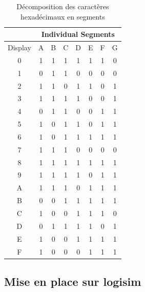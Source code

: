 \documentclass{article}
\begin{document}
    \begin{table}[H]
        \centering
        \begin{tabular}{|c|c|c|c|c|c|c|c|}
            \hline
            & \multicolumn{7}{c|}{Individual Segments} \\
            \hline
            Display & A & B & C & D & E & F & G \\
            \hline
            0       & 1 & 1 & 1 & 1 & 1 & 1 & 0 \\
            \hline
            1       & 0 & 1 & 1 & 0 & 0 & 0 & 0 \\
            \hline
            2       & 1 & 1 & 0 & 1 & 1 & 0 & 1 \\
            \hline
            3       & 1 & 1 & 1 & 1 & 0 & 0 & 1 \\
            \hline
            4       & 0 & 1 & 1 & 0 & 0 & 1 & 1 \\
            \hline
            5       & 1 & 0 & 1 & 1 & 0 & 1 & 1 \\
            \hline
            6       & 1 & 0 & 1 & 1 & 1 & 1 & 1 \\
            \hline
            7       & 1 & 1 & 1 & 0 & 0 & 0 & 0 \\
            \hline
            8       & 1 & 1 & 1 & 1 & 1 & 1 & 1 \\
            \hline
            9       & 1 & 1 & 1 & 1 & 0 & 1 & 1 \\
            \hline
            A       & 1 & 1 & 1 & 0 & 1 & 1 & 1 \\
            \hline
            B       & 0 & 0 & 1 & 1 & 1 & 1 & 1 \\
            \hline
            C       & 1 & 0 & 0 & 1 & 1 & 1 & 0 \\
            \hline
            D       & 0 & 1 & 1 & 1 & 1 & 0 & 1 \\
            \hline
            E       & 1 & 0 & 0 & 1 & 1 & 1 & 1 \\
            \hline
            F       & 1 & 0 & 0 & 0 & 1 & 1 & 1 \\
            \hline
        \end{tabular}
        \caption{Décomposition des caractères hexadécimaux en segments}
    \end{table}

    \subsection{Mise en place sur logisim}
\end{document}
